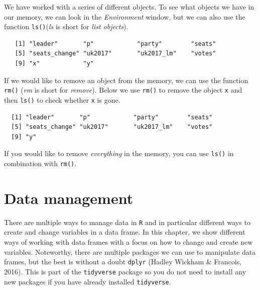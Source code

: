 \documentclass[12pt,oneside]{reedthesis}
\theoremstyle{definition}
\theoremstyle{definition}
\theoremstyle{definition}
\theoremstyle{remark}
\begin{document}
  We have worked with a series of different objects. To see what objects
  we have in our memory, we can look in the \emph{Environment} window, but
  we can also use the function \texttt{ls()}(\emph{ls} is short for
  \emph{list objects}).
  \begin{Shaded}
  \begin{Highlighting}[]
  \NormalTok{()}
  \end{Highlighting}
  \end{Shaded}
  \begin{verbatim}
   [1] "leader"       "p"            "party"        "seats"       
   [5] "seats_change" "uk2017"       "uk2017_lm"    "votes"       
   [9] "x"            "y"           
  \end{verbatim}
  If we would like to remove an object from the memory, we can use the
  function \texttt{rm()} (\emph{rm} is short for \emph{remove}). Below we
  use \texttt{rm()} to remove the object \texttt{x} and then \texttt{ls()}
  to check whether \texttt{x} is gone.
  \begin{Shaded}
  \begin{Highlighting}[]
  
  \NormalTok{()}
  \end{Highlighting}
  \end{Shaded}
  \begin{verbatim}
  [1] "leader"       "p"            "party"        "seats"       
  [5] "seats_change" "uk2017"       "uk2017_lm"    "votes"       
  [9] "y"           
  \end{verbatim}
  If you would like to remove \emph{everything} in the memory, you can use
  \texttt{ls()} in combination with \texttt{rm()}.
  \begin{Shaded}
  \begin{Highlighting}[]
  \NormalTok{(} \NormalTok{())}
  
  \NormalTok{()}
  \end{Highlighting}
  \end{Shaded}
  \chapter{Data management}\label{data}
  
  There are multiple ways to manage data in \texttt{R} and in particular
  different ways to create and change variables in a data frame. In this
  chapter, we show different ways of working with data frames with a focus
  on how to change and create new variables. Noteworthy, there are
  multiple packages we can use to manipulate data frames, but the best is
  without a doubt \texttt{dplyr} (Hadley Wickham \& Francois, 2016). This
  is part of the \texttt{tidyverse} package so you do not need to install
  any new packages if you have already installed \texttt{tidyverse}.
  
\end{document}
